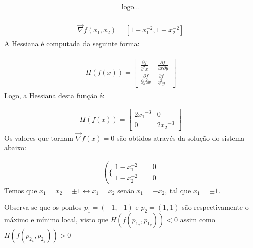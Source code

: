 \documentclass[fleqn, 11pt]{article}
\begin{document}
\begin{align*}
\begin{split}
\text{logo...}
\end{split}
\end{align*}

\begin{align*}
\begin{split}
\vec{\nabla} f(x_1,x_2) = [1 - x_{1}^{-2}, 1 - x_{2}^{-2}]
\end{split}
\end{align*}
A Hessiana é computada da seguinte forma:

\begin{align*}
\begin{split}
H(f(x)) =
\begin{bmatrix}
\frac{\partial f}{\partial^{2} x} & \frac{\partial f}{\partial x \partial y} \\ 
\frac{\partial f}{\partial y \partial x} & \frac{\partial f}{\partial^{2} y}
\end{bmatrix}
\end{split}
\end{align*}
Logo, a Hessiana desta função é:

\begin{align*}
H(f(x)) =
\begin{bmatrix}
2{x_{1}}^{-3} & 0 \\ 
0 & 2{x_{2}}^{-3}
\end{bmatrix}
\end{align*}
Os valores que tornam $\vec{\nabla} f(x) = 0$ são obtidos através da solução do sistema abaixo:

\begin{align*}
\left(\{\begin{matrix}
1-x_1^{-2} = & 0 \\ 
1-x_2^{-2} = & 0 
\end{matrix}\right.
\end{align*}
Temos que $x_1 = x_2 = \pm 1 \leftrightarrow  x_1 = x_2$ senão $x_1 = -x_2$, tal que $x_1 = \pm 1$.

Observa-se que os pontos $p_1 = (-1, -1)$ e $p_2 = (1, 1)$ são respectivamente o máximo e mínimo local, visto que $H(f(p_{1_{x}}, p_{1_{y}})) < 0$ assim como $H(f(p_{2_{x}}, p_{2_{y}})) > 0$
\end{document}
